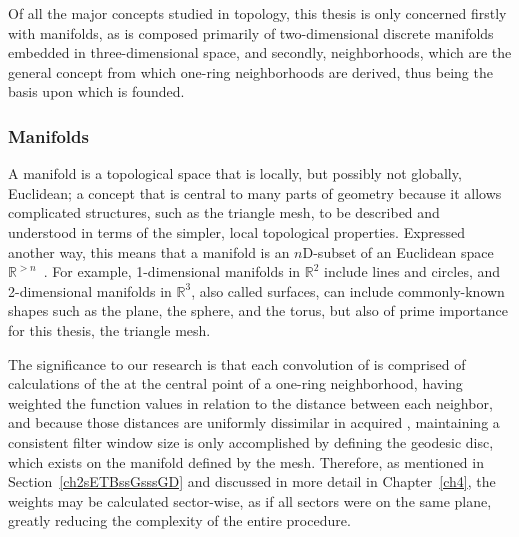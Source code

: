 Of all the major concepts studied in topology, this thesis is only concerned firstly with manifolds, as \tdd{} is composed primarily of two-dimensional discrete manifolds embedded in three-dimensional space, and secondly, neighborhoods, which are the general concept from which one-ring neighborhoods are derived, thus being the basis upon which  is founded.

%
%
\subsubsection{Manifolds}
\label{ch2sETBssTsssM}
A manifold is a topological space that is locally, but possibly not globally, Euclidean; a concept that is central to many parts of geometry because it allows complicated structures, such as the triangle mesh, to be described and understood in terms of the simpler, local topological properties. Expressed another way, this means that a manifold is an $n$D-subset of an Euclidean space $\mathbb{R}^{>n}$~\cite[p.~199]{Mara12}. For example, 1-dimensional manifolds in $\mathbb{R}^{2}$ include lines and circles, and 2-dimensional manifolds in $\mathbb{R}^{3}$, also called surfaces, can include commonly-known shapes such as the plane, the sphere, and the torus, but also of prime importance for this thesis, the triangle mesh.

The significance to our research is that each convolution of  is comprised of calculations of the  at the central point of a one-ring neighborhood, having weighted the function values in relation to the distance between each neighbor, and because those distances are uniformly dissimilar in acquired \tdd{}, maintaining a consistent filter window size is only accomplished by defining the geodesic disc, which exists on the manifold defined by the mesh. Therefore, as mentioned in Section~\ref{ch2sETBssGsssGD} and discussed in more detail in Chapter~\ref{ch4}, the weights may be calculated sector-wise, as if all sectors were on the same plane, greatly reducing the complexity of the entire procedure.

%
%
